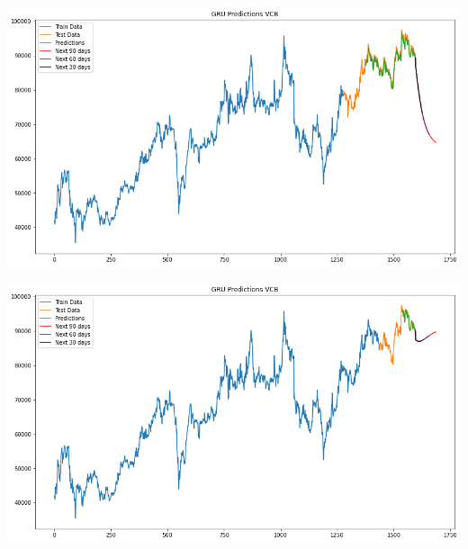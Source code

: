 \documentclass[conference]{IEEEtran}
\begin{document}
\begin{minipage}{0.21\textwidth}
    \centering
    \includegraphics[width=\linewidth]{images/GRU/GRU_VCB_82.png}
    \label{fig:image1}
\end{minipage}
\hfill
\begin{minipage}{0.21\textwidth}
    \centering
    \includegraphics[width=\linewidth]{images/GRU/GRU_VCB_91.png}
    \label{fig:image2}
\end{minipage}
\end{document}
